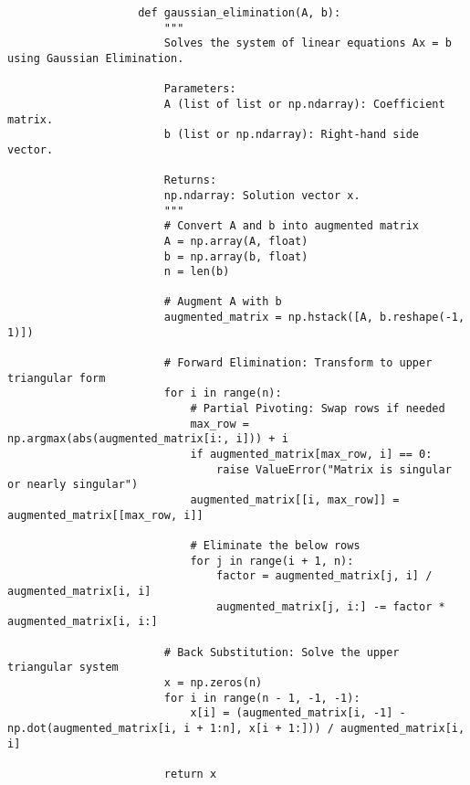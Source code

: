 \documentclass{article}
\begin{document}
                \begin{verbatim}
                    def gaussian_elimination(A, b):
                        """
                        Solves the system of linear equations Ax = b using Gaussian Elimination.

                        Parameters:
                        A (list of list or np.ndarray): Coefficient matrix.
                        b (list or np.ndarray): Right-hand side vector.

                        Returns:
                        np.ndarray: Solution vector x.
                        """
                        # Convert A and b into augmented matrix
                        A = np.array(A, float)
                        b = np.array(b, float)
                        n = len(b)

                        # Augment A with b
                        augmented_matrix = np.hstack([A, b.reshape(-1, 1)])

                        # Forward Elimination: Transform to upper triangular form
                        for i in range(n):
                            # Partial Pivoting: Swap rows if needed
                            max_row = np.argmax(abs(augmented_matrix[i:, i])) + i
                            if augmented_matrix[max_row, i] == 0:
                                raise ValueError("Matrix is singular or nearly singular")
                            augmented_matrix[[i, max_row]] = augmented_matrix[[max_row, i]]

                            # Eliminate the below rows
                            for j in range(i + 1, n):
                                factor = augmented_matrix[j, i] / augmented_matrix[i, i]
                                augmented_matrix[j, i:] -= factor * augmented_matrix[i, i:]

                        # Back Substitution: Solve the upper triangular system
                        x = np.zeros(n)
                        for i in range(n - 1, -1, -1):
                            x[i] = (augmented_matrix[i, -1] - np.dot(augmented_matrix[i, i + 1:n], x[i + 1:])) / augmented_matrix[i, i]

                        return x
                \end{verbatim}
\end{document}
